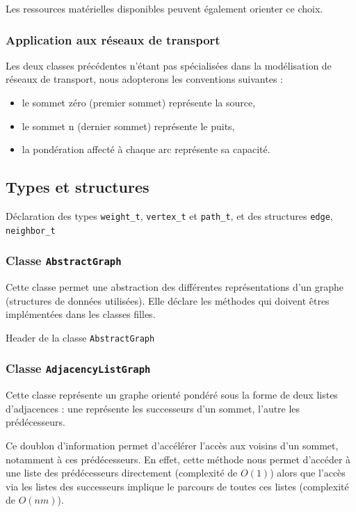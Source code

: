 Les ressources matérielles disponibles peuvent également orienter ce choix.

\subsubsection{Application aux réseaux de transport}
Les deux classes précédentes n'étant pas spécialisées dans la modélisation de réseaux de transport, nous adopterons les conventions suivantes :
\begin{itemize}
\item le sommet zéro (premier sommet) représente la source,
\item le sommet n (dernier sommet) représente le puits,
\item la pondération affecté à chaque arc représente sa capacité.
\end{itemize}

\subsection{Types et structures}

Déclaration des types \texttt{weight\_t}, \texttt{vertex\_t} et \texttt{path\_t}, et des structures \texttt{edge}, \texttt{neighbor\_t}



\subsubsection{Classe \texttt{AbstractGraph}}

Cette classe permet une abstraction des différentes représentations d'un graphe (structures de données utilisées). Elle déclare les méthodes qui doivent êtres implémentées dans les classes filles.

Header de la classe \texttt{AbstractGraph}



\subsubsection{Classe \texttt{AdjacencyListGraph}}
Cette classe représente un graphe orienté pondéré sous la forme de deux listes d'adjacences : une représente les successeurs d'un sommet, l'autre les prédécesseurs.

Ce doublon d'information permet d'accélérer l'accès aux voisins d'un sommet, notamment à ces prédécesseurs. En effet, cette méthode nous permet d'accéder à une liste des prédécesseurs directement (complexité de $O(1)$) alors que l'accès via les listes des successeurs implique le parcours de toutes ces listes (complexité de $O(nm)$).

